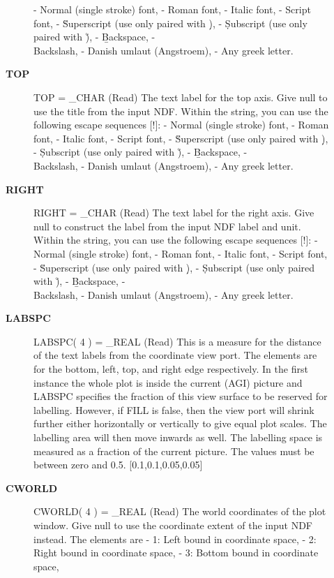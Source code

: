 \begin{description}
\begin{description}
   - \fn Normal (single stroke) font,
   - \fr Roman font,
   - \fi Italic font,
   - \fs Script font,
   - \u  Superscript (use only paired with \d),
   - \d  Subscript (use only paired with \u),
   - \b  Backspace,
   - \\  Backslash,
   - \A  Danish umlaut (Angstroem),
   - \g  Any greek letter.
\item [{\bf TOP}]
TOP = _CHAR (Read)
   The text label for the top axis. Give null to use the title
   from the input NDF. Within the string, you can use the
   following escape sequences [!]:
   - \fn Normal (single stroke) font,
   - \fr Roman font,
   - \fi Italic font,
   - \fs Script font,
   - \u  Superscript (use only paired with \d),
   - \d  Subscript (use only paired with \u),
   - \b  Backspace,
   - \\  Backslash,
   - \A  Danish umlaut (Angstroem),
   - \g  Any greek letter.
\item [{\bf RIGHT}]
RIGHT = _CHAR (Read)
   The text label for the right axis. Give null to construct the
   label from the input NDF label and unit. Within the string, you
   can use the following escape sequences [!]:
   - \fn Normal (single stroke) font,
   - \fr Roman font,
   - \fi Italic font,
   - \fs Script font,
   - \u  Superscript (use only paired with \d),
   - \d  Subscript (use only paired with \u),
   - \b  Backspace,
   - \\  Backslash,
   - \A  Danish umlaut (Angstroem),
   - \g  Any greek letter.
\item [{\bf LABSPC}]
LABSPC( 4 ) = _REAL (Read)
   This is a measure for the distance of the text labels from the
   coordinate view port. The elements are for the bottom, left,
   top, and right edge respectively. In the first instance the
   whole plot is inside the current (AGI) picture and LABSPC
   specifies the fraction of this view surface to be reserved for
   labelling. However, if FILL is false, then the view port will
   shrink further either horizontally or vertically to give equal
   plot scales. The labelling area will then move inwards as
   well. The labelling space is measured as a fraction of the
   current picture. The values must be between zero and 0.5.
   [0.1,0.1,0.05,0.05]
\item [{\bf CWORLD}]
CWORLD( 4 ) = _REAL (Read)
   The world coordinates of the plot window. Give null to use the
   coordinate extent of the input NDF instead. The elements are
   - 1: Left bound in coordinate space,
   - 2: Right bound in coordinate space,
   - 3: Bottom bound in coordinate space,

\end{description}
\end{description}
